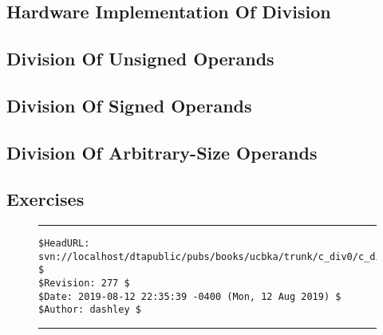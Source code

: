 
\chapter{\cdivzerolongtitle{}}

\label{cdiv0}

\section{Hardware Implementation Of Division}

\section{Division Of Unsigned Operands}

\section{Division Of Signed Operands}

\section{Division Of Arbitrary-Size Operands}

\section{Exercises}



\noindent\begin{figure}[!b]
\noindent\rule[-0.25in]{\textwidth}{1pt}
\begin{tiny}
\begin{verbatim}
$HeadURL: svn://localhost/dtapublic/pubs/books/ucbka/trunk/c_div0/c_div0.tex $
$Revision: 277 $
$Date: 2019-08-12 22:35:39 -0400 (Mon, 12 Aug 2019) $
$Author: dashley $
\end{verbatim}
\end{tiny}
\noindent\rule[0.25in]{\textwidth}{1pt}
\end{figure}

%
